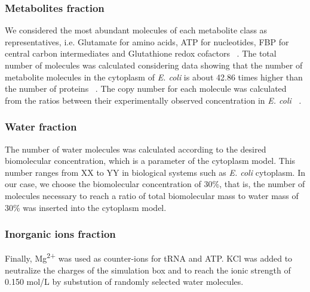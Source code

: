 \documentclass[journal=jacsat,manuscript=article]{achemso}
\begin{document}
\subsubsection{Metabolites fraction}
We considered the most abundant molecules of each metabolite class as representatives, i.e. Glutamate for amino acids, ATP for nucleotides, FBP for central carbon intermediates and Glutathione redox cofactors ~\cite{metabolite_proportion}. The total number of molecules was calculated considering data showing that the number of metabolite molecules in the cytoplasm of \textit{E. coli} is about 42.86 times higher than the number of proteins ~\cite{metabolite_proportion}. The copy number for each molecule was calculated from the ratios between their experimentally observed concentration in \em{E. coli} ~\cite{metabolite_proportion}.

\subsubsection{Water fraction}
The number of water molecules was calculated according to the desired biomolecular concentration, which is a parameter of the cytoplasm model. This number ranges from \colorbox{red!50}{XX to YY} in biological systems such as \textit{E. coli} cytoplasm. In our case, we choose the biomolecular concentration of 30\%, that is, the number of molecules necessary to reach a ratio of total biomolecular mass to water mass of 30\% was inserted into the cytoplasm model.

\subsubsection{Inorganic ions fraction}
Finally, Mg\textsuperscript{2+} was used as counter-ions for tRNA and ATP. KCl was added to neutralize the charges of the simulation box and to reach the ionic strength of 0.150 mol/L by substution of randomly selected water molecules.
\end{document}
